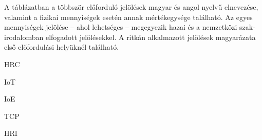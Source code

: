 \documentclass[12pt,a4paper,twoside]{article}
\begin{document}
A táblázatban a többször előforduló jelölések magyar és angol nyelvű elnevezése, valamint a fizikai mennyiségek esetén annak mértékegysége található. Az egyes mennyiségek jelölése – ahol lehetséges – megegyezik hazai és a nemzetközi szak-irodalomban elfogadott jelölésekkel. A ritkán alkalmazott jelölések magyarázata első előfordulási helyüknél található.
\newpage\thispagestyle{fancy}
%




\clearpage


	\clearpage
	
	\clearpage
	
	\clearpage
	
	\clearpage
	
	\clearpage
	
	\clearpage
	

%

\newpage

%


%

\newpage
\begin{abbreviations}
	\item[HRC]	
	\item[IoT]	
	\item[IoE]	
	\item[TCP]	
	\item[HRI]	
\end{abbreviations}

%
\end{document}
